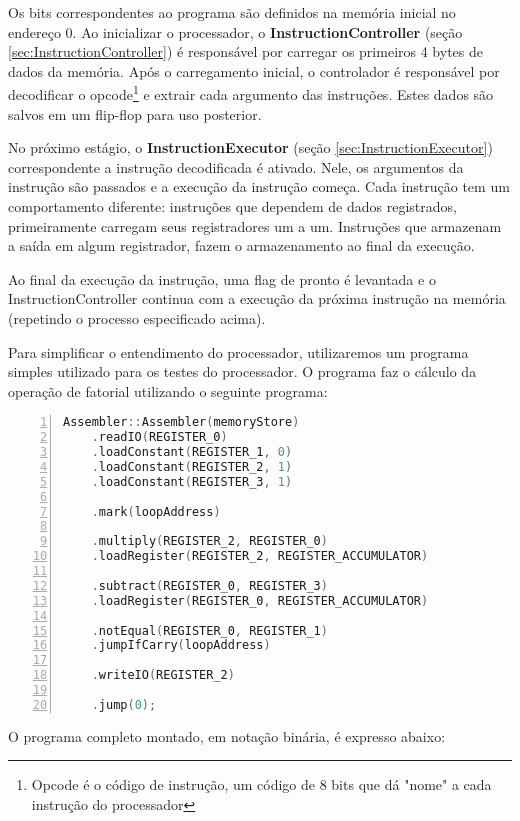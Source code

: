 \documentclass[11pt]{report}
\begin{document}
Os bits correspondentes ao programa são definidos na memória inicial no endereço $0$. Ao inicializar o processador, o \textbf{InstructionController} (seção \ref{sec:InstructionController}) é responsável por carregar os primeiros 4 bytes de dados da memória. Após o carregamento inicial, o controlador é responsável por decodificar o opcode\footnote{Opcode é o código de instrução, um código de 8 bits que dá "nome" a cada instrução do processador} e extrair cada argumento das instruções. Estes dados são salvos em um flip-flop para uso posterior.

No próximo estágio, o \textbf{InstructionExecutor} (seção \ref{sec:InstructionExecutor}) correspondente a instrução decodificada é ativado. Nele, os argumentos da instrução são passados e a execução da instrução começa. Cada instrução tem um comportamento diferente: instruções que dependem de dados registrados, primeiramente carregam seus registradores um a um. Instruções que armazenam a saída em algum registrador, fazem o armazenamento ao final da execução.

Ao final da execução da instrução, uma flag de pronto é levantada e o InstructionController continua com a execução da próxima instrução na memória (repetindo o processo especificado acima).

Para simplificar o entendimento do processador, utilizaremos um programa simples utilizado para os testes do processador. O programa faz o cálculo da operação de fatorial utilizando o seguinte programa:

\begin{lstlisting}[language=C++,caption={Exemplo de código utilizado pelo Assembler},stepnumber=1,numbers=left,showlines=true]
Assembler::Assembler(memoryStore)
	.readIO(REGISTER_0)
	.loadConstant(REGISTER_1, 0)
	.loadConstant(REGISTER_2, 1)
	.loadConstant(REGISTER_3, 1)

	.mark(loopAddress)

	.multiply(REGISTER_2, REGISTER_0)
	.loadRegister(REGISTER_2, REGISTER_ACCUMULATOR)

	.subtract(REGISTER_0, REGISTER_3)
	.loadRegister(REGISTER_0, REGISTER_ACCUMULATOR)

	.notEqual(REGISTER_0, REGISTER_1)
	.jumpIfCarry(loopAddress)

	.writeIO(REGISTER_2)

	.jump(0);
\end{lstlisting}

O programa completo montado, em notação binária, é expresso abaixo:
\end{document}
